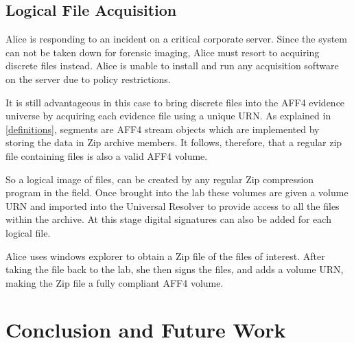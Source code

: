 \documentclass[10pt, conference]{IEEEtran}
\begin{document}


\subsection{Logical File Acquisition}
Alice is responding to an incident on a critical corporate
server. Since the system can not be taken down for forensic imaging,
Alice must resort to acquiring discrete files instead. Alice is unable
to install and run any acquisition software on the server due to
policy restrictions.

It is still advantageous in this case to bring discrete files into the
AFF4 evidence universe by acquiring each evidence file using a unique
URN. As explained in \ref{definitions}, segments are AFF4 stream
objects which are implemented by storing the data in Zip archive
members. It follows, therefore, that a regular zip file containing
files is also a valid AFF4 volume.

So a logical image of files, can be created by any regular Zip
compression program in the field. Once brought into the lab these
volumes are given a volume URN and imported into the Universal
Resolver to provide access to all the files within the archive. At
this stage digital signatures can also be added for each logical file.

Alice uses windows explorer to obtain a Zip file of the files of
interest. After taking the file back to the lab, she then signs the
files, and adds a volume URN, making the Zip file a fully compliant
AFF4 volume.

\section{Conclusion and Future Work}
\end{document}
